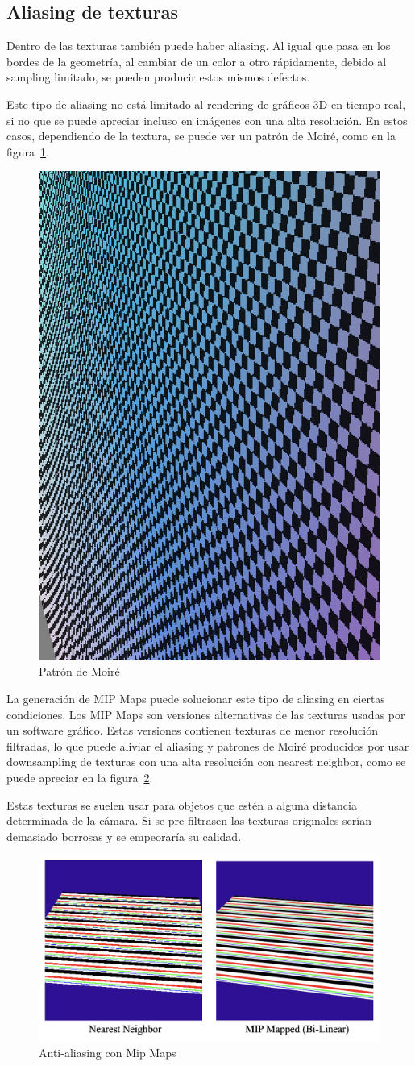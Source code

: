 \documentclass[withindex, glossary]{cam-thesis}
\begin{document}
\subsection{Aliasing de texturas}

Dentro de las texturas también puede haber aliasing. Al igual que pasa en los bordes de la geometría, al cambiar de un color a otro rápidamente, debido al sampling limitado, se pueden producir estos mismos defectos.

Este tipo de aliasing no está limitado al rendering de gráficos 3D en tiempo real, si no que se puede apreciar incluso en imágenes con una alta resolución. En estos casos, dependiendo de la textura, se puede ver un patrón de Moiré, como en la figura~\ref{moire}.

\begin{figure}[!htbp]
    \includegraphics[width=.3\linewidth]{figures/moire.png}
    \caption{Patrón de Moiré\cite{studysupersampling}}
    \label{moire}
\end{figure}

La generación de MIP Maps puede solucionar este tipo de aliasing en ciertas condiciones. Los MIP Maps son versiones alternativas de las texturas usadas por un software gráfico. Estas versiones contienen texturas de menor resolución filtradas, lo que puede aliviar el aliasing y patrones de Moiré producidos por usar downsampling de texturas con una alta resolución con nearest neighbor, como se puede apreciar en la figura~\ref{mipmaps}.

Estas texturas se suelen usar para objetos que estén a alguna distancia determinada de la cámara. Si se pre-filtrasen las texturas originales serían demasiado borrosas y se empeoraría su calidad.

\begin{figure}[!htbp]
    \includegraphics[width=.8\linewidth]{figures/mipmaps.png}
    \caption{Anti-aliasing con Mip Maps}
    \label{mipmaps}
\end{figure}
\end{document}
